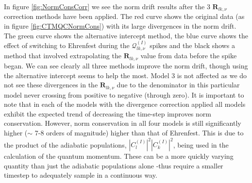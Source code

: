 In figure \ref{fig:NormConsCorr} we see the norm drift results after the 3 $\mathbf{R}_{lk, \nu}$ correction methods have been applied. The red curve shows the original data (as in figure \ref{fig:CTMQCNormCons}) with its large divergences in the norm drift. The green curve shows the alternative intercept method, the blue curve shows the effect of switching to Ehrenfest during the $\mathcal{Q}_{lk, \nu}^{(I)}$ spikes and the black shows a method that involved extrapolating the $\mathbf{R}_{lk, \nu}$ value from data before the spike began. We can see clearly all three methods improve the norm drift, though using the alternative intercept seems to help the most. Model 3 is not affected as we do not see these divergences in the $\mathbf{R}_{lk, \nu}$ due to the denominator in this particular model never crossing from positive to negative (through zero). It is important to note that in each of the models with the divergence correction applied all models exhibit the expected trend of decreasing the time-step improves norm conservation. However, norm conservation in all four models is still significantly higher ($\sim$ 7-8 orders of magnitude) higher than that of Ehrenfest.  This is due to the product of the adiabatic populations, $|C_{l}^{(I)}|^2 |C_{k}^{(I)}|^2$, being used in the calculation of the quantum momentum. These can be a more quickly varying quantity than just the adiabatic populations alone -thus require a smaller timestep to adequately sample in a continuous way.


